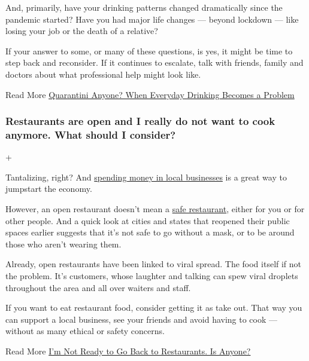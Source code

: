 And, primarily, have your drinking patterns changed dramatically since
the pandemic started? Have you had major life changes --- beyond
lockdown --- like losing your job or the death of a relative?

If your answer to some, or many of these questions, is yes, it might be
time to step back and reconsider. If it continues to escalate, talk with
friends, family and doctors about what professional help might look
like.

Read More
\href{https://www.nytimes3xbfgragh.onion/2020/04/30/us/30IHW-drinking-women-coronavirus-quarantine-habit.html}{Quarantini
Anyone? When Everyday Drinking Becomes a Problem}

\hypertarget{restaurants-are-open-and-i-really-do-not-want-to-cook-anymore-what-should-i-consider}{%
\subsubsection{Restaurants are open and I really do not want to cook
anymore. What should I
consider?}\label{restaurants-are-open-and-i-really-do-not-want-to-cook-anymore-what-should-i-consider}}

+

Tantalizing, right? And
\href{https://www.nytimes3xbfgragh.onion/2020/06/23/dining/outdoor-restaurants-nyc-coronavirus.html}{spending
money in local businesses} is a great way to jumpstart the economy.

However, an open restaurant doesn't mean a
\href{https://www.nytimes3xbfgragh.onion/2020/05/15/dining/restaurant-opening-safety-coronavirus.html}{safe
restaurant}, either for you or for other people. And a quick look at
cities and states that reopened their public spaces earlier suggests
that it's not safe to go without a mask, or to be around those who
aren't wearing them.

Already, open restaurants have been linked to viral spread. The food
itself if not the problem. It's customers, whose laughter and talking
can spew viral droplets throughout the area and all over waiters and
staff.

If you want to eat restaurant food, consider getting it as take out.
That way you can support a local business, see your friends and avoid
having to cook --- without as many ethical or safety concerns.

Read More
\href{https://www.nytimes3xbfgragh.onion/2020/06/30/dining/restaurant-risks-coronavirus.html}{I'm
Not Ready to Go Back to Restaurants. Is Anyone?}

